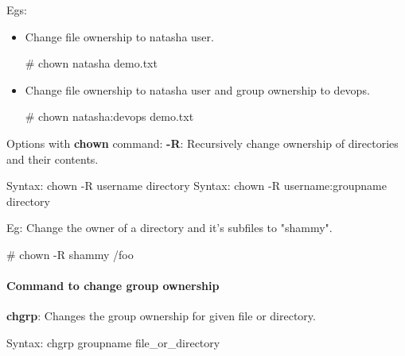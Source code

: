 \begin{flushleft}
Egs:
\begin{itemize}
	\item Change file ownership to natasha user.
	\begin{tcolorbox}[breakable,notitle,boxrule=-0pt,colback=black,colframe=black]
		\color{green}
		\font=9pt
		\# chown natasha demo.txt
		\font=4pt
	\end{tcolorbox}	
	\bigskip

	\item Change file ownership to natasha user and group ownership to devops.
	\begin{tcolorbox}[breakable,notitle,boxrule=-0pt,colback=black,colframe=black]
		\color{green}
		\font=9pt
		\# chown natasha:devops demo.txt
		\font=4pt
	\end{tcolorbox}
	\bigskip

\end{itemize}

Options with \textbf{chown} command:	
\newline
\textbf{-R}: Recursively change ownership of directories and their contents.
\begin{tcolorbox}[breakable,notitle,boxrule=0pt,colback=pink,colframe=pink]
	\color{black}
	\font=9pt
	Syntax: chown -R username directory
	\newline
	Syntax: chown -R username:groupname directory
	\font=4pt
\end{tcolorbox}

Eg: Change the owner of a directory and it's subfiles to "shammy".
\begin{tcolorbox}[breakable,notitle,boxrule=-0pt,colback=black,colframe=black]
	\color{green}
	\font=9pt
	\# chown -R shammy /foo
	\font=4pt
\end{tcolorbox}


\newpage

\paragraph{Command to change group ownership}
\bigskip
\textbf{chgrp}: Changes the group ownership for given file or directory.

\begin{tcolorbox}[breakable,notitle,boxrule=0pt,colback=pink,colframe=pink]
	\color{black}
	\font=9pt
	Syntax: chgrp groupname file\_or\_directory
	\font=4pt
\end{tcolorbox}


\end{flushleft}
